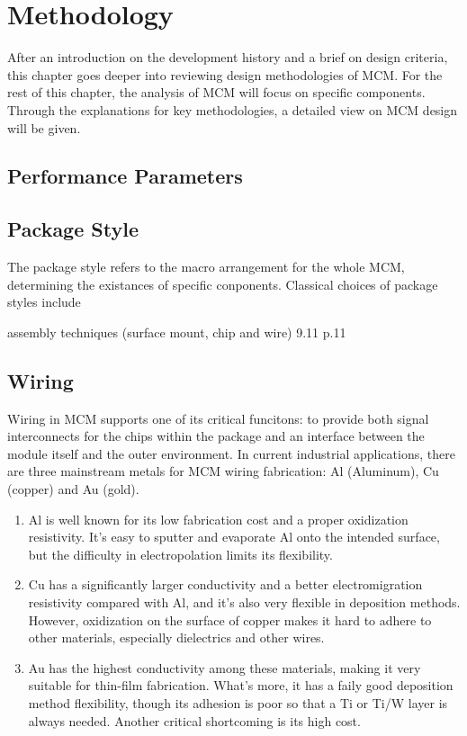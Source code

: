 
\chapter{Methodology}
\begin{spacing}{1.5}
\setlength{\parskip}{0.3in}

After an introduction on the development history and a brief on design criteria, this chapter goes deeper into reviewing design methodologies of MCM. For the rest of this chapter, the analysis of MCM will focus on specific components. Through the explanations for key methodologies, a detailed view on MCM design will be given. 

\section{Performance Parameters} 



\section{Package Style}

The package style refers to the macro arrangement for the whole MCM, determining the existances of specific conponents. Classical choices of package styles include 

assembly techniques (surface mount, chip and wire) 9.11 p.11 \cite{chen2006vlsi} 

\section{Wiring}

Wiring in MCM supports one of its critical funcitons: to provide both signal interconnects for the chips within the package and an interface between the module itself and the outer environment. In current industrial applications, there are three mainstream metals for MCM wiring fabrication: Al (Aluminum), Cu (copper) and Au (gold). 

\begin{enumerate}
    \item Al is well known for its low fabrication cost and a proper oxidization resistivity. It's easy to sputter and evaporate Al onto the intended surface, but the difficulty in electropolation limits its flexibility. 
    \item Cu has a significantly larger conductivity and a better electromigration resistivity compared with Al, and it's also very flexible in deposition methods. However, oxidization on the surface of copper makes it hard to adhere to other materials, especially dielectrics and other wires. 
    \item Au has the highest conductivity among these materials, making it very suitable for thin-film fabrication. What's more, it has a faily good deposition method flexibility, though its adhesion is poor so that a Ti or Ti/W layer is always needed. Another critical shortcoming is its high cost. 
\end{enumerate} 


\end{spacing}
